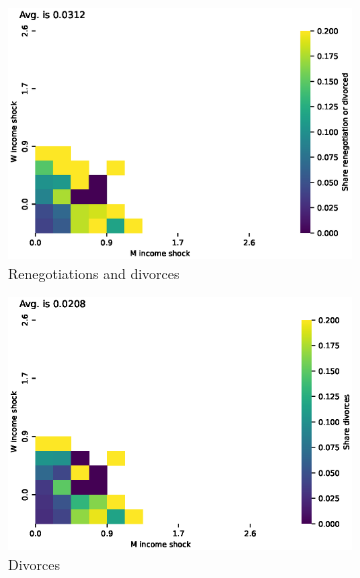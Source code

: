 \documentclass[]{article}
\begin{document}
\begin{figure}[H]
	\centering
	\begin{subfigure}{0.49\textwidth} %
		\centering
		\includegraphics[width=\textwidth]{shocks_ren_div.eps} %
		\caption{Renegotiations and divorces}
		\label{fig:picture1}
	\end{subfigure}
	\begin{subfigure}{0.49\textwidth}
		\centering
		\includegraphics[width=\textwidth]{shocks_div.eps} %
		\caption{Divorces}
		\label{fig:picture2}
	\end{subfigure}
	\begin{subfigure}{0.49\textwidth}

\end{subfigure}
\end{figure}
\end{document}
